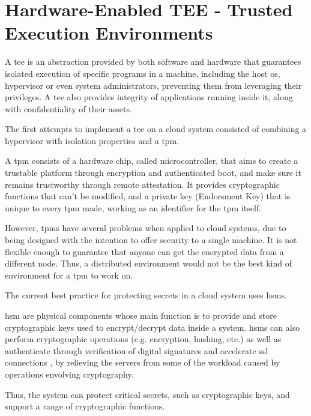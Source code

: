 
\section{Hardware-Enabled TEE - Trusted Execution Environments}
\label{sec:tpm_hsm_tees}

A \gls{tee} is an abstraction provided by both software and hardware that guarantees isolated execution of specific programs in a machine, including the host \gls{os}, hypervisor or even system administrators, preventing them from leveraging their privileges. A \gls{tee} also provides integrity of applications running inside it, along with confidentiality of their assets.

The first attempts to implement a \gls{tee} on a cloud system consisted of combining a hypervisor with isolation properties and a \gls{tpm}. 

A \gls{tpm} \cite{tpmPaper} consists of a hardware chip, called microcontroller, that aims to create a trustable platform through encryption and authenticated boot, and make sure it remains trustworthy through remote attestation. 
It provides cryptographic functions that can't be modified, and a private key (Endorsment Key) that is unique to every \gls{tpm} made, working as an identifier for the \gls{tpm} itself.

However, \gls{tpm}s have several problems when applied to cloud systems, due to being designed with the intention to offer security to a single machine. It is not flexible enough to guarantee that anyone can get the encrypted data from a different node.
Thus, a distributed environment would not be the best kind of environment for a \gls{tpm} to work on.

The current best practice for protecting secrets in a cloud system uses \gls{hsm}s. 

\gls{hsm} \cite{hsmPaper} are physical components whose main function is to provide and store cryptographic keys used to encrypt/decrypt data inside a system. \gls{hsm}s can also perform cryptographic operations (e.g. encryption, hashing, etc.) as well as authenticate through verification of digital signatures and accelerate \gls{ssl} connections \cite{hsmThesis}, by relieving the servers from some of the workload caused by operations envolving cryptography. 

Thus, the system can protect critical secrets, such as cryptographic keys, and support a range of cryptographic functions.

